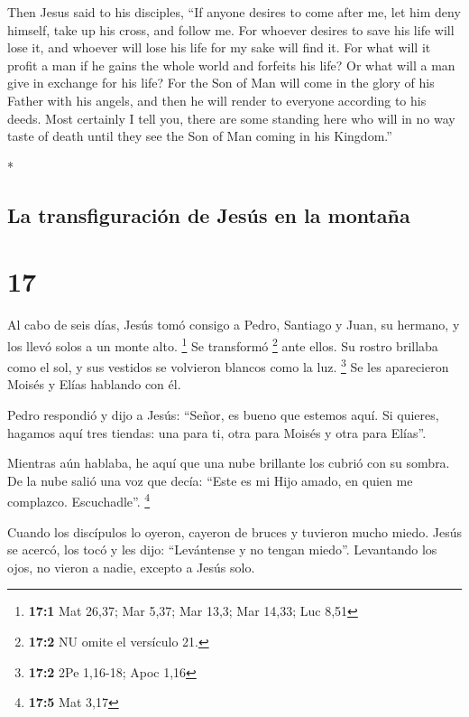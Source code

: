 \begin{paracol}{2}
\begin{otherlanguage}{english}
 Then Jesus said to his disciples, ``If anyone desires to
come after me, let him deny himself, take up his cross, and follow me.
 For whoever desires to save his life will lose it, and
whoever will lose his life for my sake will find it.  For
what will it profit a man if he gains the whole world and forfeits his
life? Or what will a man give in exchange for his life? 
For the Son of Man will come in the glory of his Father with his angels,
and then he will render to everyone according to his deeds.
 Most certainly I tell you, there are some standing here
who will in no way taste of death until they see the Son of Man coming
in his Kingdom.''

\end{otherlanguage}

\switchcolumn[0]*

\hypertarget{la-transfiguraciuxf3n-de-jesuxfas-en-la-montauxf1a}{%
\subsection{La transfiguración de Jesús en la
montaña}\label{la-transfiguraciuxf3n-de-jesuxfas-en-la-montauxf1a}}

\hypertarget{section-32}{%
\section{17}\label{section-32}}

 Al cabo de seis días, Jesús tomó consigo a Pedro,
Santiago y Juan, su hermano, y los llevó solos a un monte alto.
\footnote{\textbf{17:1} Mat 26,37; Mar 5,37; Mar 13,3; Mar 14,33; Luc
  8,51}  Se transformó \footnote{\textbf{17:2} NU omite el
  versículo 21.} ante ellos. Su rostro brillaba como el sol, y sus
vestidos se volvieron blancos como la luz. \footnote{\textbf{17:2} 2Pe
  1,16-18; Apoc 1,16}  Se les aparecieron Moisés y Elías
hablando con él.

 Pedro respondió y dijo a Jesús: ``Señor, es bueno que
estemos aquí. Si quieres, hagamos aquí tres tiendas: una para ti, otra
para Moisés y otra para Elías''.

 Mientras aún hablaba, he aquí que una nube brillante los
cubrió con su sombra. De la nube salió una voz que decía: ``Este es mi
Hijo amado, en quien me complazco. Escuchadle''. \footnote{\textbf{17:5}
  Mat 3,17}

 Cuando los discípulos lo oyeron, cayeron de bruces y
tuvieron mucho miedo.  Jesús se acercó, los tocó y les
dijo: ``Levántense y no tengan miedo''.  Levantando los
ojos, no vieron a nadie, excepto a Jesús solo.


\end{paracol}
